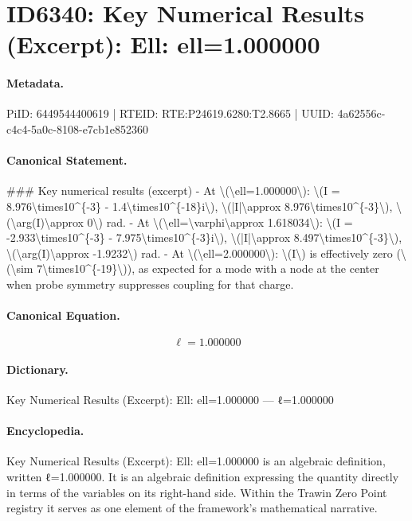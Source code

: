 \section*{ID6340: Key Numerical Results (Excerpt): Ell: ell=1.000000}
\paragraph{Metadata.}
PiID: 6449544400619 | RTEID: RTE:P24619.6280:T2.8665 | UUID: 4a62556c-c4c4-5a0c-8108-e7cb1e852360

\paragraph{Canonical Statement.}
\#\#\# Key numerical results (excerpt) - At \textbackslash{}(\textbackslash{}ell=1.000000\textbackslash{}): \textbackslash{}(I = 8.976\textbackslash{}times10\textasciicircum{}\{-3\} - 1.4\textbackslash{}times10\textasciicircum{}\{-18\}i\textbackslash{}), \textbackslash{}(|I|\textbackslash{}approx 8.976\textbackslash{}times10\textasciicircum{}\{-3\}\textbackslash{}), \textbackslash{}(\textbackslash{}arg(I)\textbackslash{}approx 0\textbackslash{}) rad. - At \textbackslash{}(\textbackslash{}ell=\textbackslash{}varphi\textbackslash{}approx 1.618034\textbackslash{}): \textbackslash{}(I = -2.933\textbackslash{}times10\textasciicircum{}\{-3\} - 7.975\textbackslash{}times10\textasciicircum{}\{-3\}i\textbackslash{}), \textbackslash{}(|I|\textbackslash{}approx 8.497\textbackslash{}times10\textasciicircum{}\{-3\}\textbackslash{}), \textbackslash{}(\textbackslash{}arg(I)\textbackslash{}approx -1.9232\textbackslash{}) rad. - At \textbackslash{}(\textbackslash{}ell=2.000000\textbackslash{}): \textbackslash{}(I\textbackslash{}) is effectively zero (\textbackslash{}(\textbackslash{}sim 7\textbackslash{}times10\textasciicircum{}\{-19\}\textbackslash{})), as expected for a mode with a node at the center when probe symmetry suppresses coupling for that charge.

\paragraph{Canonical Equation.}
\[
\ell=1.000000
\]

\paragraph{Dictionary.}
Key Numerical Results (Excerpt): Ell: ell=1.000000 — ℓ=1.000000

\paragraph{Encyclopedia.}
Key Numerical Results (Excerpt): Ell: ell=1.000000 is an algebraic definition, written ℓ=1.000000. It is an algebraic definition expressing the quantity directly in terms of the variables on its right-hand side. Within the Trawin Zero Point registry it serves as one element of the framework's mathematical narrative.
